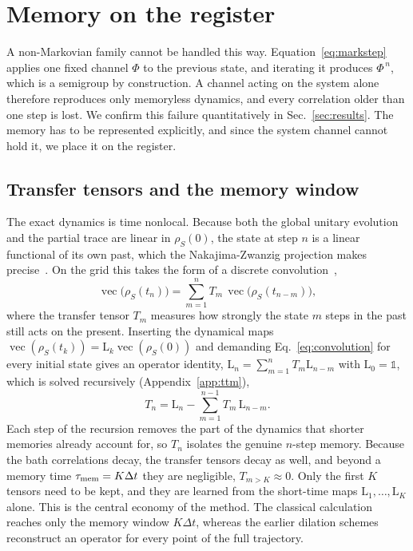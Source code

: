 \documentclass[aps,pra,twocolumn,superscriptaddress,nofootinbib,longbibliography]{revtex4-2}
\DeclareMathOperator{\vecc}{vec}
\newcommand{\id}{\mathds{1}}
\newcommand{\rhoS}{\rho_{S}}
\newcommand{\Lmap}{\mathrm{L}}
\newcommand{\dt}{\Delta t}
\begin{document}
\section{Memory on the register}
\label{sec:memory}
A non-Markovian family cannot be handled this way. Equation~\eqref{eq:markstep}
applies one fixed channel $\Phi$ to the previous state, and iterating it produces
$\Phi^{\,n}$, which is a semigroup by construction. A channel acting on the
system alone therefore reproduces only memoryless dynamics, and every
correlation older than one step is lost. We confirm this failure quantitatively
in Sec.~\ref{sec:results}. The memory has to be represented explicitly, and since
the system channel cannot hold it, we place it on the register.

\subsection{Transfer tensors and the memory window}
The exact dynamics is time nonlocal. Because both the global unitary evolution
and the partial trace are linear in $\rhoS(0)$, the state at step $n$ is a linear
functional of its own past, which the Nakajima-Zwanzig projection makes
precise~\cite{nakajima1958,zwanzig1960}. On the grid this takes the form of a
discrete convolution~\cite{cerrillo2014},
\begin{equation}
  \label{eq:convolution}
  \vecc\!\big(\rhoS(t_n)\big)=\sum_{m=1}^{n} T_m\,\vecc\!\big(\rhoS(t_{n-m})\big),
\end{equation}
where the transfer tensor $T_m$ measures how strongly the state $m$ steps in the
past still acts on the present. Inserting the dynamical maps
$\vecc(\rhoS(t_k))=\Lmap_k\vecc(\rhoS(0))$ and demanding
Eq.~\eqref{eq:convolution} for every initial state gives an operator identity,
$\Lmap_n=\sum_{m=1}^{n}T_m\Lmap_{n-m}$ with $\Lmap_0=\id$, which is solved
recursively (Appendix~\ref{app:ttm}),
\begin{equation}
  \label{eq:ttm}
  T_n=\Lmap_n-\sum_{m=1}^{n-1}T_m\,\Lmap_{n-m}.
\end{equation}
Each step of the recursion removes the part of the dynamics that shorter memories
already account for, so $T_n$ isolates the genuine $n$-step memory. Because the
bath correlations decay, the transfer tensors decay as well, and beyond a memory
time $\tau_{\rm mem}=K\dt$ they are negligible, $T_{m>K}\approx0$. Only the first
$K$ tensors need to be kept, and they are learned from the short-time maps
$\Lmap_1,\dots,\Lmap_K$ alone. This is the central economy of the method. The
classical calculation reaches only the memory window $K\dt$, whereas the earlier
dilation schemes reconstruct an operator for every point of the full
trajectory.
\end{document}
